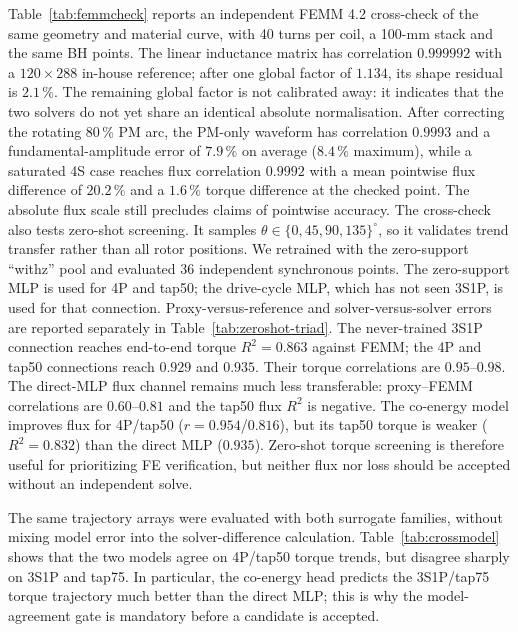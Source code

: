 \documentclass[review]{elsarticle}
\begin{document}
Table~\ref{tab:femmcheck} reports an independent FEMM 4.2 cross-check of
the same geometry and material curve, with 40 turns per coil, a 100-mm stack
and the same BH points. The linear inductance matrix has
correlation $0.999992$ with a $120\times288$ in-house reference; after one
global factor of $1.134$, its shape residual is $2.1\,\%$. The remaining
global factor is not calibrated away: it indicates that the two solvers do
not yet share an identical absolute normalisation. After correcting the
rotating 80\,\% PM arc, the PM-only waveform has correlation $0.9993$ and a
fundamental-amplitude error of $7.9\,\%$ on average ($8.4\,\%$ maximum),
while a saturated 4S case reaches flux correlation $0.9992$ with a mean
pointwise flux difference of $20.2\,\%$ and a $1.6\,\%$ torque difference
at the checked point.
The absolute flux scale still precludes claims of pointwise accuracy. The
cross-check also tests zero-shot screening. It samples
$\theta\in\{0,45,90,135\}^\circ$, so it validates trend transfer rather
than all rotor positions. We retrained with the
zero-support ``withz'' pool and evaluated 36 independent synchronous points.
The zero-support MLP is used for 4P and tap50; the drive-cycle MLP, which
has not seen 3S1P, is used for that connection. Proxy-versus-reference and
solver-versus-solver errors are
reported separately in Table~\ref{tab:zeroshot-triad}. The never-trained
3S1P connection reaches end-to-end torque $R^2=0.863$ against FEMM; the
4P and tap50 connections reach $0.929$ and $0.935$. Their torque
correlations are $0.95$--$0.98$. The direct-MLP flux channel remains much
less transferable: proxy--FEMM correlations are $0.60$--$0.81$ and the
tap50 flux $R^2$ is negative. The co-energy model improves flux for
4P/tap50 ($r=0.954$/$0.816$), but its tap50 torque is weaker
($R^2=0.832$) than the direct MLP ($0.935$). Zero-shot torque screening is
therefore useful for prioritizing FE verification, but neither flux nor
loss should be accepted without an independent solve.

The same trajectory arrays were evaluated with both surrogate families,
without mixing model error into the solver-difference calculation.
Table~\ref{tab:crossmodel} shows that the two models agree on 4P/tap50
torque trends, but disagree sharply on 3S1P and tap75. In particular, the
co-energy head predicts the 3S1P/tap75 torque trajectory much better than
the direct MLP; this is why the model-agreement gate is mandatory before a
candidate is accepted.
\end{document}
